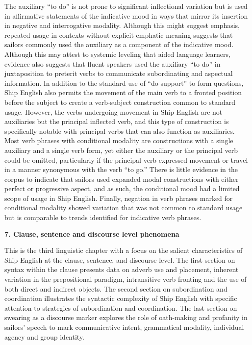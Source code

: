 \begin{styleStandard}
The auxiliary “to do” is not prone to significant inflectional variation but is used in affirmative statements of the indicative mood in ways that mirror its insertion in negative and interrogative modality. Although this might suggest emphasis, repeated usage in contexts without explicit emphatic meaning suggests that sailors commonly used the auxiliary as a component of the indicative mood. Although this may attest to systemic leveling that aided language learners, evidence also suggests that fluent speakers used the auxiliary “to do” in juxtaposition to preterit verbs to communicate subordinating and aspectual information. In addition to the standard use of “do support” to form questions, Ship English also permits the movement of the main verb to a fronted position before the subject to create a verb-subject construction common to standard usage. However, the verbs undergoing movement in Ship English are not auxiliaries but the principal inflected verb, and this type of construction is specifically notable with principal verbs that can also function as auxiliaries. Most verb phrases with conditional modality are constructions with a single auxiliary and a single verb form, yet either the auxiliary or the principal verb could be omitted, particularly if the principal verb expressed movement or travel in a manner synonymous with the verb “to go.” There is little evidence in the corpus to indicate that sailors used expanded modal constructions with either perfect or progressive aspect, and as such, the conditional mood had a limited scope of usage in Ship English. Finally, negation in verb phrases marked for conditional modality showed variation that was not common to standard usage but is comparable to trends identified for indicative verb phrases. 
\end{styleStandard}


\clearpage\begin{styleStandard}
\textbf{7. Clause, sentence and discourse level phenomena}
\end{styleStandard}


\begin{styleStandard}
This is the third linguistic chapter with a focus on the salient characteristics of Ship English at the clause, sentence, and discourse level. The first section on syntax within the clause presents data on adverb use and placement, inherent variation in the prepositional paradigm, intransitive verb fronting and the use of both direct and indirect objects. The second section on subordination and coordination illustrates the syntactic complexity of Ship English with specific attention to strategies of subordination and coordination. The last section on swearing as a discourse marker explores the role of oath-making and profanity in sailors’ speech to mark communicative intent, grammatical modality, individual agency and group identity. 
\end{styleStandard}


